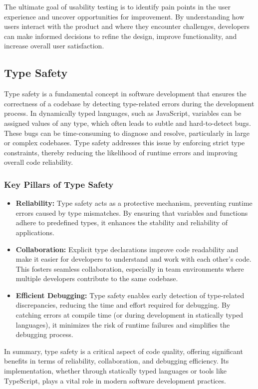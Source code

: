 The ultimate goal of usability testing is to identify pain points in the user experience and uncover opportunities for improvement. By understanding how users interact with the product and where they encounter challenges, developers can make informed decisions to refine the design, improve functionality, and increase overall user satisfaction. \cite{geeksforgeeks:user-test}

\subsection{Type Safety}
\label{subsec:type-safety}

Type safety is a fundamental concept in software development that ensures the correctness of a codebase by detecting type-related errors during the development process. In dynamically typed languages, such as JavaScript, variables can be assigned values of any type, which often leads to subtle and hard-to-detect bugs. These bugs can be time-consuming to diagnose and resolve, particularly in large or complex codebases. Type safety addresses this issue by enforcing strict type constraints, thereby reducing the likelihood of runtime errors and improving overall code reliability. \cite{dev:type-safety}

\subsubsection*{Key Pillars of Type Safety}
\label{subsubsec:type-safety-pillars}

\begin{itemize}
    \item \textbf{Reliability:} Type safety acts as a protective mechanism, preventing runtime errors caused by type mismatches. By ensuring that variables and functions adhere to predefined types, it enhances the stability and reliability of applications. \cite{dev:type-safety}

    \item \textbf{Collaboration:} Explicit type declarations improve code readability and make it easier for developers to understand and work with each other's code. This fosters seamless collaboration, especially in team environments where multiple developers contribute to the same codebase. \cite{dev:type-safety}

    \item \textbf{Efficient Debugging:} Type safety enables early detection of type-related discrepancies, reducing the time and effort required for debugging. By catching errors at compile time (or during development in statically typed languages), it minimizes the risk of runtime failures and simplifies the debugging process. \cite{dev:type-safety}
\end{itemize}

In summary, type safety is a critical aspect of code quality, offering significant benefits in terms of reliability, collaboration, and debugging efficiency. Its implementation, whether through statically typed languages or tools like TypeScript, plays a vital role in modern software development practices. \cite{dev:type-safety}
